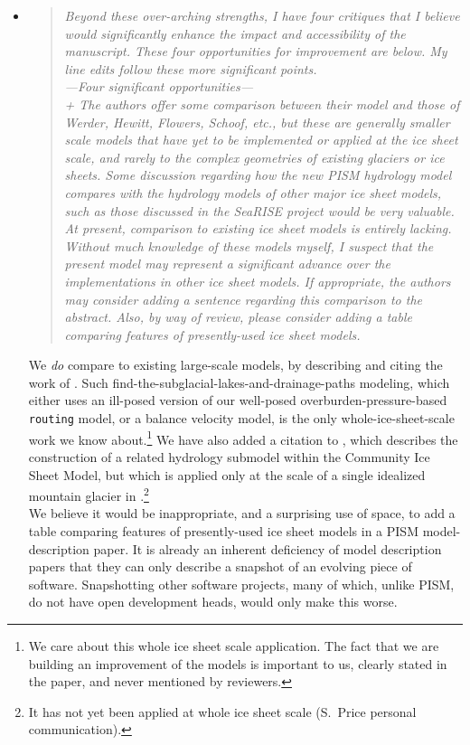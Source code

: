 \documentclass[11pt,reqno]{amsart}
\newcommand{\reply}[2]{
\medskip\medskip
\item  \begin{quote}
\emph{#1}
\end{quote}

\medskip
\noindent #2}
\begin{document}
\begin{itemize}
\reply{Beyond these over-arching strengths, I have four critiques that I believe would significantly enhance the impact and accessibility of the manuscript. These four opportunities for improvement are below. My line edits follow these more significant points.\\
---Four significant opportunities---\\
+ The authors offer some comparison between
their model and those of Werder, Hewitt, Flowers, Schoof, etc., but these are generally smaller scale models that have yet to be implemented or applied at the ice sheet
scale, and rarely to the complex geometries of existing glaciers or ice sheets. Some
discussion regarding how the new PISM hydrology model compares with the hydrology models of other major ice sheet models, such as those discussed in the SeaRISE
project would be very valuable.  At present, comparison to existing ice sheet models is
entirely lacking.  Without much knowledge of these models myself, I suspect that the
present model may represent a significant advance over the implementations in other
ice sheet models.  If appropriate, the authors may consider adding a sentence regarding this comparison to the abstract.  Also, by way of review, please consider adding a
table comparing features of presently-used ice sheet models.}
{We \emph{do} compare to existing large-scale models, by describing and citing the work of \cite{Goeller2014,LeBrocqetal2009,Livingstoneetal2013,Siegertetal2009}.  Such find-the-subglacial-lakes-and-drainage-paths modeling, which either uses an ill-posed version of our well-posed overburden-pressure-based \texttt{routing} model, or a balance velocity model, is the only whole-ice-sheet-scale work we know about.\footnote{We care about this whole ice sheet scale application.  The fact that we are building an improvement of the \cite{Goeller2014,LeBrocqetal2009,Livingstoneetal2013,Siegertetal2009} models is important to us, clearly stated in the paper, and never mentioned by reviewers.}  We have also added a citation to \cite{HoffmanPrice2014}, which describes the construction of a related hydrology submodel within the Community Ice Sheet Model, but which is applied only at the scale of a single idealized mountain glacier in \cite{HoffmanPrice2014}.\footnote{It has not yet been applied at whole ice sheet scale (S.~Price personal communication).}\\
\indent We believe it would be inappropriate, and a surprising use of space, to add a table comparing features of presently-used ice sheet models in a PISM model-description paper.  It is already an inherent deficiency of model description papers that they can only describe a snapshot of an evolving piece of software.  Snapshotting other software projects, many of which, unlike PISM, do not have open development heads, would only make this worse.}


\end{itemize}
\end{document}
